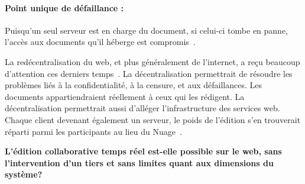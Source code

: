 \paragraph{Point unique de défaillance :} Puisqu'un seul serveur est en charge
du document, si celui-ci tombe en panne, l'accès aux documents qu'il héberge est
compromis~\cite{demers1987epidemic}.

La redécentralisation du web, et plus généralement de l'internet, a reçu
beaucoup d'attention ces derniers temps~\cite{benet2014ipfs,
  mansour2016demonstration, wood2014ethereum}. La décentralisation permettrait
de résoudre les problèmes liés à la confidentialité, à la censure, et aux
défaillances. Les documents appartiendraient réellement à ceux qui les
rédigent. La décentralisation permettrait aussi d'alléger l'infrastructure des
services web. Chaque client devenant également un serveur, le poids de l'édition
s'en trouverait réparti parmi les participants au lieu du
Nuage~\cite{mell2011national}.


\textbf{L'édition collaborative temps réel est-elle possible sur le web, sans
  l'intervention d'un tiers et sans limites quant aux dimensions du système?}

